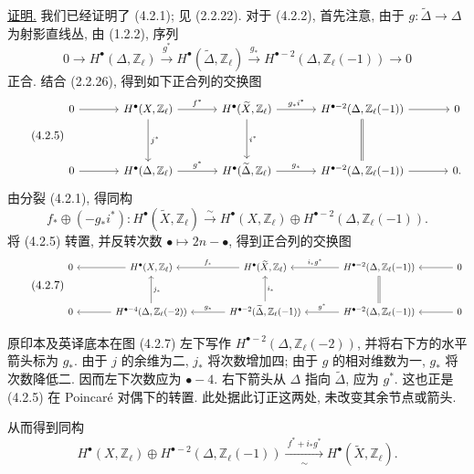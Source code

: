 \underline{证明.}
我们已经证明了 (4.2.1); 见 (2.2.22). 对于 (4.2.2), 首先注意, 由于 $g:\widetilde\Delta\to\Delta$ 为射影直线丛, 由 (1.2.2), 序列
\begin{equation}\tag{4.2.4}
0\longrightarrow H^\bullet(\Delta,\mathbb Z_\ell)
\xrightarrow{g^*}H^\bullet(\widetilde\Delta,\mathbb Z_\ell)
\xrightarrow{g_*}H^{\bullet-2}(\Delta,\mathbb Z_\ell(-1))
\longrightarrow0
\end{equation}
正合. 结合 (2.2.26), 得到如下正合列的交换图
\begin{equation}\tag{4.2.5}
\resizebox{\textwidth}{!}{%
\begin{tikzcd}[ampersand replacement=\&,column sep=large,row sep=huge]
0\arrow[r]
  \&H^\bullet(X,\mathbb Z_\ell)
       \arrow[r,"f^*"]\arrow[d,"j^*" right]
  \&H^\bullet(\widetilde X,\mathbb Z_\ell)
       \arrow[r,"g_*i^*"]\arrow[d,"i^*" right]
  \&H^{\bullet-2}(\Delta,\mathbb Z_\ell(-1))
       \arrow[r]\arrow[d,equal]
  \&0\\
0\arrow[r]
  \&H^\bullet(\Delta,\mathbb Z_\ell)
       \arrow[r,"g^*"]
  \&H^\bullet(\widetilde\Delta,\mathbb Z_\ell)
       \arrow[r,"g_*"]
  \&H^{\bullet-2}(\Delta,\mathbb Z_\ell(-1))
       \arrow[r]
  \&0.
\end{tikzcd}}
\end{equation}
由分裂 (4.2.1), 得同构
\begin{equation}\tag{4.2.6}
f_*\oplus(-g_*i^*):
H^\bullet(\widetilde X,\mathbb Z_\ell)
\xrightarrow{\sim}
H^\bullet(X,\mathbb Z_\ell)\oplus
H^{\bullet-2}(\Delta,\mathbb Z_\ell(-1)).
\end{equation}
将 (4.2.5) 转置, 并反转次数 $\bullet\mapsto2n-\bullet$, 得到正合列的交换图
\begin{equation}\tag{4.2.7}
\resizebox{\textwidth}{!}{%
\begin{tikzcd}[ampersand replacement=\&,column sep=large,row sep=large]
0
  \&H^\bullet(X,\mathbb Z_\ell)\arrow[l]
  \&H^\bullet(\widetilde X,\mathbb Z_\ell)\arrow[l,"f_*"']
  \&H^{\bullet-2}(\Delta,\mathbb Z_\ell(-1))
       \arrow[l,"i_*g^*"']
  \&0\arrow[l]\\
0
  \&H^{\bullet-4}(\Delta,\mathbb Z_\ell(-2))
       \arrow[l]\arrow[u,"j_*"']
  \&H^{\bullet-2}(\widetilde\Delta,\mathbb Z_\ell(-1))
       \arrow[l,"g_*"']\arrow[u,"i_*"']
  \&H^{\bullet-2}(\Delta,\mathbb Z_\ell(-1))
       \arrow[l,"g^*"']\arrow[u,equal]
  \&0\arrow[l]
\end{tikzcd}}
\end{equation}
\begin{editorialnote}
原印本及英译底本在图 (4.2.7) 左下写作 $H^{\bullet-2}(\Delta,\mathbb Z_\ell(-2))$, 并将右下方的水平箭头标为 $g_*$. 由于 $j$ 的余维为二, $j_*$ 将次数增加四; 由于 $g$ 的相对维数为一, $g_*$ 将次数降低二. 因而左下次数应为 $\bullet-4$. 右下箭头从 $\Delta$ 指向 $\widetilde\Delta$, 应为 $g^*$. 这也正是 (4.2.5) 在 Poincar\'e 对偶下的转置. 此处据此订正这两处, 未改变其余节点或箭头.
\end{editorialnote}

从而得到同构
\begin{equation}\tag{4.2.8}
H^\bullet(X,\mathbb Z_\ell)\oplus
H^{\bullet-2}(\Delta,\mathbb Z_\ell(-1))
\xrightarrow[\sim]{\ f^*+i_*g^*\ }
H^\bullet(\widetilde X,\mathbb Z_\ell).
\end{equation}
